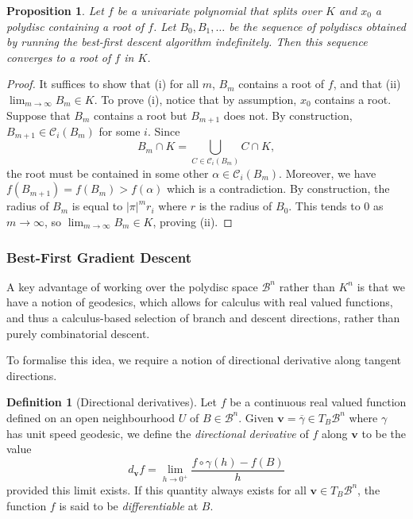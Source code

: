 \documentclass[10pt]{article}
\newtheorem{proposition}[theorem]{Proposition}
\theoremstyle{definition}
\newtheorem{definition}[theorem]{Definition}
\renewcommand{\vec}[1]{\mathbf{#1}}
\begin{document}
\begin{proposition}\label{thm:best-first-descent-convergence}
    Let $f$ be a univariate polynomial that splits over $K$ and $x_0$ a polydisc containing a root of $f$. Let $B_0, B_1, \dotsc$ be the sequence of polydiscs obtained by running the best-first descent algorithm indefinitely. Then this sequence converges to a root of $f$ in $K$.
\end{proposition}

\begin{proof}
    It suffices to show that (i) for all $m$, $B_m$ contains a root of $f$, and that (ii) $\lim_{m \to \infty} B_m \in K$.
    To prove (i), notice that by assumption, $x_0$ contains a root. Suppose that $B_m$ contains a root but $B_{m+1}$ does not. By construction, $B_{m+1} \in \mathcal{C}_i(B_m)$ for some $i$.
    Since 
    $$
        B_m \cap K = \bigcup_{C \in \mathcal{C}_i(B_m)} C \cap K,
    $$
    the root must be contained in some other $\alpha \in \mathcal{C}_i(B_m)$. Moreover, we have
    $
    f(B_{m+1}) = f(B_m) > f(\alpha)
    $
    which is a contradiction.
    By construction, the radius of $B_m$ is equal to $\lvert \pi \rvert ^{m}r_i$ where $r$ is the radius of $B_0$. This tends to $0$ as $m \to \infty$, so $\lim_{m \to \infty} B_m \in K$, proving (ii).
\end{proof}

\subsubsection{Best-First Gradient Descent}
\label{subsec:best-first-gradient-search}

A key advantage of working over the polydisc space $\mathcal{B}^n$ rather than $K^n$ is that we have a notion of geodesics, which allows for calculus with real valued functions, and thus a calculus-based selection of branch and descent directions, rather than purely combinatorial descent.

To formalise this idea, we require a notion of directional derivative along tangent directions.

\begin{definition}[Directional derivatives]
Let $f$ be a continuous real valued function defined on an open neighbourhood $U$ of $B \in \mathcal{B}^n$. Given $\vec{v} = \overline\gamma \in T_B \mathcal{B}^n$ where $\gamma$ has unit speed geodesic, we define the \emph{directional derivative} of $f$ along $\vec{v}$ to be the value
$$
d_{\vec{v}} f = \lim_{h \to 0^+} \frac{f \circ \gamma (h) - f(B)}{h}
$$
provided this limit exists. If this quantity always exists for all $\vec{v} \in T_B \mathcal{B}^n$, the function $f$ is said to be \emph{differentiable} at $B$. 
\end{definition}
\end{document}
